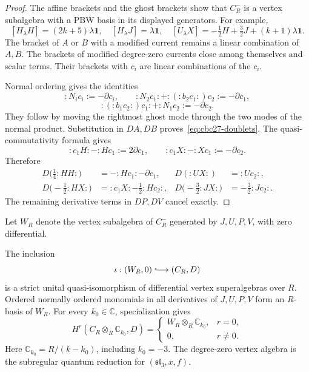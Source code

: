 \begin{proof}
The affine brackets and the ghost brackets show that $C_R^-$ is a vertex subalgebra with a PBW basis in its displayed generators.
For example,
\[
 [H_\lambda H]=(2k+5)\lambda\mathbf1,\quad
 [H_\lambda J]=\lambda\mathbf1,\quad
 [U_\lambda X]=-\tfrac12H+\tfrac32J+(k+1)\lambda\mathbf1.
\]
The bracket of $A$ or $B$ with a modified current remains a linear combination of $A,B$.
The brackets of modified degree-zero currents close among themselves and scalar terms.
Their brackets with $c_i$ are linear combinations of the $c_i$.

Normal ordering gives the identities
\[
 :N_ic_i:=-\partial c_i,\qquad
 :N_2c_1:+:(:b_2c_1:)c_2:=-\partial c_1,
\]
\[
 :(:b_1c_2:)c_1:+:N_1c_2:=-\partial c_2.
\]
They follow by moving the rightmost ghost mode through the two modes of the normal product.
Substitution in $DA,DB$ proves~\eqref{eq:cbc27-doublets}.
The quasi-commutativity formula gives
\[
 :c_1H:-:Hc_1:=2\partial c_1,
 \qquad :c_1X:-:Xc_1:=-\partial c_2.
\]
Therefore
\begin{align*}
 D\bigl(\tfrac14:HH:\bigr)&=-:Hc_1:-\partial c_1,
 &D(:UX:)&=:Uc_2:,\\
 D\bigl(-\tfrac12:HX:\bigr)&=:c_1X:-\tfrac12:Hc_2:,
 &D\bigl(-\tfrac32:JX:\bigr)&=-\tfrac32:Jc_2:.
\end{align*}
The remaining derivative terms in $DP,DV$ cancel exactly.
\end{proof}

Let $W_R$ denote the vertex subalgebra of $C_R^-$ generated by $J,U,P,V$, with zero differential.

\begin{theorem}\label{thm:cbc27-subregular-map}
The inclusion
\begin{equation}\label{eq:cbc27-iota}
 \iota:(W_R,0)\lhook\joinrel\longrightarrow(C_R,D)
\end{equation}
is a strict unital quasi-isomorphism of differential vertex superalgebras over $R$.
Ordered normally ordered monomials in all derivatives of $J,U,P,V$ form an $R$-basis of $W_R$.
For every $k_0\in\mathbb C$, specialization gives
\[
 H^r(C_R\otimes_R\mathbb C_{k_0},D)=
 \begin{cases}W_R\otimes_R\mathbb C_{k_0},&r=0,\\0,&r\ne0.\end{cases}
\]
Here $\mathbb C_{k_0}=R/(k-k_0)$, including $k_0=-3$.
The degree-zero vertex algebra is the subregular quantum reduction for $(\mathfrak{sl}_3,x,f)$.
\end{theorem}

